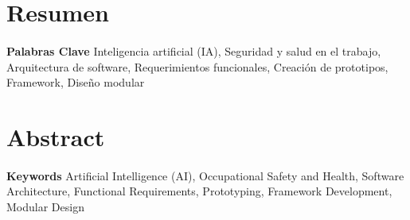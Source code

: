 
\section*{Resumen}
\paragraph*{}{\textbf{Palabras Clave}}
Inteligencia artificial (IA), Seguridad y salud en el trabajo, Arquitectura de software, Requerimientos funcionales, Creación de prototipos, Framework, Diseño modular

\section*{Abstract}
\paragraph*{}{\textbf{Keywords}}
Artificial Intelligence (AI), Occupational Safety and Health, Software Architecture, Functional Requirements, Prototyping, Framework Development, Modular Design
